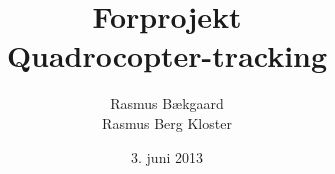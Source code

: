 \documentclass[a4paper, 12pt]{report}
\title{Forprojekt
\\
Quadrocopter-tracking}
\date{3. juni 2013}
\author{Rasmus Bækgaard\\Rasmus Berg Kloster}
\begin{document}
\maketitle
\tableofcontents

\listoffixmes










\end{document}
